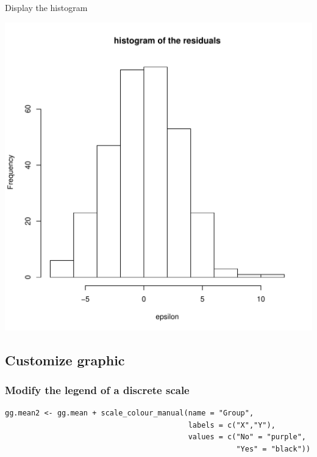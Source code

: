 \documentclass{article}
\begin{document}
Display the histogram
\begin{center}
\includegraphics[width=.9\linewidth]{./figures/fig-hist-residuals.pdf}
\end{center}

\subsection{Customize graphic}
\label{sec:orgfed167b}

\subsubsection{Modify the legend of a discrete scale}
\label{sec:orgbdaeb9c}

\lstset{language=r,label= ,caption= ,captionpos=b,numbers=none}
\begin{lstlisting}
gg.mean2 <- gg.mean + scale_colour_manual(name = "Group",
										  labels = c("X","Y"),
										  values = c("No" = "purple", 
													 "Yes" = "black"))
\end{lstlisting}
\end{document}
